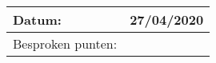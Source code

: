 \begin{tabularx}{\textwidth}{| l | X |}
  \hline
  Datum: & 27/04/2020\\
  \hline
  Besproken punten: &
  \begin{compactitem}
    \item \hl{}
    \item \hl{}
    \item \hl{}
  \end{compactitem}\\
  \hline
\end{tabularx}